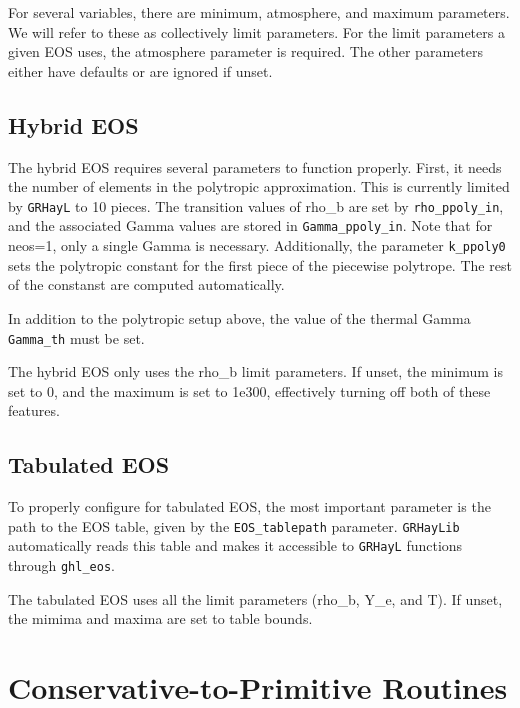 \documentclass{article}
\newcommand{\grhayl}{\texttt{GRHayL}\xspace}
\newcommand{\glib}{\texttt{GRHayLib}\xspace}
\begin{document}
For several variables, there are minimum, atmosphere, and maximum parameters.
We will refer to these as collectively limit parameters. For the limit
parameters a given EOS uses, the atmosphere parameter is required. The other
parameters either have defaults or are ignored if unset.

\subsection{Hybrid EOS}

The hybrid EOS requires several parameters to function properly.
First, it needs the number of elements in the polytropic approximation.
This is currently limited by \grhayl to 10 pieces. The transition values
of rho\_b are set by \texttt{rho\_ppoly\_in}, and the associated Gamma
values are stored in \texttt{Gamma\_ppoly\_in}. Note that for neos=1,
only a single Gamma is necessary. Additionally, the parameter \texttt{k\_ppoly0}
sets the polytropic constant for the first piece of the piecewise polytrope.
The rest of the constanst are computed automatically.

In addition to the polytropic setup above, the value of the thermal Gamma
\texttt{Gamma\_th} must be set.

The hybrid EOS only uses the rho\_b limit parameters. If unset, the
minimum is set to 0, and the maximum is set to 1e300, effectively turning
off both of these features.

\subsection{Tabulated EOS}

To properly configure for tabulated EOS, the most important parameter is
the path to the EOS table, given by the \texttt{EOS\_tablepath} parameter.
\glib automatically reads this table and makes it accessible to \grhayl
functions through \texttt{ghl\_eos}.

The tabulated EOS uses all the limit parameters (rho\_b, Y\_e, and T).
If unset, the mimima and maxima are set to table bounds.

\section{Conservative-to-Primitive Routines}
\end{document}
